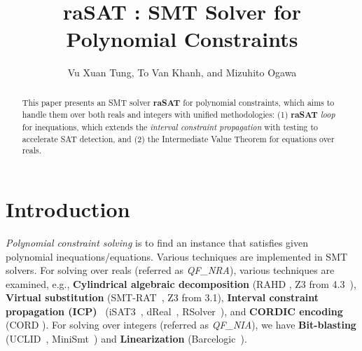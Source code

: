 \documentclass[runningheads,a4paper,oribibl]{llncs}
\begin{document}
%

\title{raSAT : SMT Solver for Polynomial Constraints}
\author{Vu Xuan Tung, To Van Khanh, and Mizuhito Ogawa} 


\maketitle

\begin{abstract}
  This paper presents an SMT solver {\bf raSAT} for polynomial constraints, 
  which aims to handle them over both reals and integers with
  unified methodologies: (1) {\bf raSAT} {\em loop} for inequations,
  which extends the \emph{interval constraint propagation}
  with testing to accelerate SAT detection, and 
  (2) the Intermediate Value Theorem for equations over reals. 
\end{abstract}


\section{Introduction}
{\em Polynomial constraint solving} is to find an instance that satisfies given
polynomial inequations/equations. Various techniques are implemented in SMT solvers.
For solving over reals (referred as \emph{QF\_NRA}), various techniques are examined, 
e.g., 
{\bf Cylindrical algebraic decomposition}
(RAHD \cite{Passmore09combineddecision}, 
  Z3 from 4.3~\cite{Jovanovic13}), 
{\bf Virtual substitution} (SMT-RAT~\cite{smtrat}, 
  Z3 from 3.1), 
{\bf Interval constraint propagation (ICP)}~\cite{benhamou:hal-00480814}
(iSAT3~\cite{isat}, dReal~\cite{dRealCADE13}, RSolver~\cite{rsolver}),
and 
{\bf CORDIC encoding} (CORD \cite{cordic}). 
For solving over integers (referred as \emph{QF\_NIA}), we have 
{\bf Bit-blasting} (UCLID~\cite{Bryant07decidingbit-vector}, 
  MiniSmt~\cite{Zankl:2010:SNR:1939141.1939168}) and 
{\bf Linearization} (Barcelogic~\cite{Barcelogic08}). 
\end{document}
